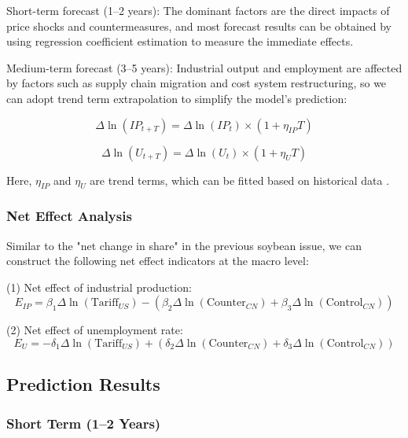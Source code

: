 \documentclass{apmcmthesis}
\begin{document}
Short-term forecast (1--2 years): The dominant factors are the direct impacts of price shocks and countermeasures, and most forecast results can be obtained by using regression coefficient estimation to measure the immediate effects.

Medium-term forecast (3--5 years): Industrial output and employment are affected by factors such as supply chain migration and cost system restructuring, so we can adopt trend term extrapolation to simplify the model's prediction:

\begin{equation}
\Delta \ln(IP_{t+T}) = \Delta \ln(IP_t) \times (1 + \eta_{IP} T)
\end{equation}

\begin{equation}
\Delta \ln(U_{t+T}) = \Delta \ln(U_t) \times (1 + \eta_{U} T)
\end{equation}

Here, $\eta_{IP}$ and $\eta_{U}$ are trend terms, which can be fitted based on historical data \cite{imf2025weo}.

\subsubsection{Net Effect Analysis}

Similar to the "net change in share" in the previous soybean issue, we can construct the following net effect indicators at the macro level:

(1) Net effect of industrial production:
\begin{equation}
E_{IP} = 
\beta_1 \Delta\ln(\text{Tariff}_{US})
-
\left(
\beta_2 \Delta\ln(\text{Counter}_{CN})
+
\beta_3 \Delta\ln(\text{Control}_{CN})
\right)
\end{equation}

(2) Net effect of unemployment rate:
\begin{equation}
E_{U} = 
- \delta_1 \Delta\ln(\text{Tariff}_{US})
+
\left(
\delta_2 \Delta\ln(\text{Counter}_{CN})
+
\delta_3 \Delta\ln(\text{Control}_{CN})
\right)
\end{equation}

\subsection{Prediction Results}
\subsubsection{Short Term (1–2 Years)}
\end{document}
